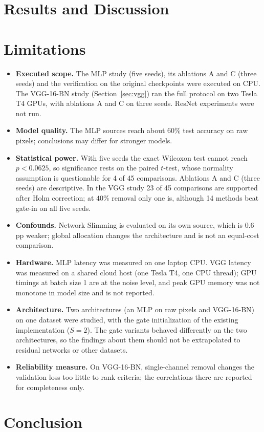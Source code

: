 \documentclass[conference]{IEEEtran}
\begin{document}
\section{Results and Discussion}\label{sec:results}


\section{Limitations}
\begin{itemize}
\item \textbf{Executed scope.} The MLP study (five seeds), its ablations A and C (three
seeds) and the verification on the original checkpoints were executed on CPU. The
VGG-16-BN study (Section~\ref{sec:vgg}) ran the full protocol on two Tesla T4 GPUs, with
ablations A and C on three seeds. ResNet experiments were not run.
\item \textbf{Model quality.} The MLP sources reach about 60\% test accuracy on raw
pixels; conclusions may differ for stronger models.
\item \textbf{Statistical power.} With five seeds the exact Wilcoxon test cannot reach
$p<0.0625$, so significance rests on the paired $t$-test, whose normality assumption is
questionable for 4 of 45 comparisons. Ablations A and C (three seeds) are descriptive. In
the VGG study 23 of 45 comparisons are supported after Holm correction; at $40\%$ removal
only one is, although 14 methods beat gate-in on all five seeds.
\item \textbf{Confounds.} Network Slimming is evaluated on its own source, which is
$0.6$\,pp weaker; global allocation changes the architecture and is not an equal-cost
comparison.
\item \textbf{Hardware.} MLP latency was measured on one laptop CPU. VGG latency was
measured on a shared cloud host (one Tesla T4, one CPU thread); GPU timings at batch size 1
are at the noise level, and peak GPU memory was not monotone in model size and is not
reported.
\item \textbf{Architecture.} Two architectures (an MLP on raw pixels and VGG-16-BN) on one
dataset were studied, with the gate initialization of the existing implementation
($S=2$). The gate variants behaved differently on the two architectures, so the findings
about them should not be extrapolated to residual networks or other datasets.
\item \textbf{Reliability measure.} On VGG-16-BN, single-channel removal changes the
validation loss too little to rank criteria; the correlations there are reported for
completeness only.
\end{itemize}

\section{Conclusion}




\end{document}
